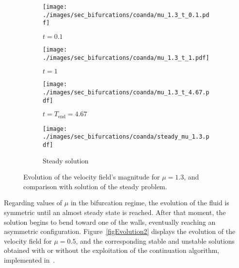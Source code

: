 \documentclass[reqno]{amsart}[standalone]
\theoremstyle{definition}
\theoremstyle{remark}
\begin{document}
\begin{figure}[ht]
\centering

\begin{subfigure}{0.47\linewidth}
\centering
\texttt{[image: ./images/sec\_bifurcations/coanda/mu\_1.3\_t\_0.1.pdf]}
\caption{$t=0.1$}
\end{subfigure}%
\hfill
\begin{subfigure}{0.47\linewidth}
\centering
\texttt{[image: ./images/sec\_bifurcations/coanda/mu\_1.3\_t\_1.pdf]}
\caption{$t=1$}
\end{subfigure}

\vspace{0.2cm}

\begin{subfigure}{0.47\linewidth}
\centering
\texttt{[image: ./images/sec\_bifurcations/coanda/mu\_1.3\_t\_4.67.pdf]}
\caption{$t = T_\text{end}=4.67$}
\end{subfigure}%
\hfill
\begin{subfigure}{0.47\linewidth}
\centering
\texttt{[image: ./images/sec\_bifurcations/coanda/steady\_mu\_1.3.pdf]}
\caption{Steady solution}
\end{subfigure}

\caption{Evolution of the velocity field's magnitude for $\mu = 1.3$, and comparison with solution of the steady problem.}
    \label{figEvolution1}
\end{figure}

Regarding values of $\mu$ in the bifurcation regime, the evolution of the fluid is symmetric until an almost steady state is reached.
After that moment, the solution begins to bend toward one of the walls, eventually reaching an asymmetric configuration.
Figure~\ref{figEvolution2} displays the evolution of the velocity field for $\mu=0.5$, and the corresponding stable and unstable solutions obtained with or without the exploitation of the continuation algorithm, implemented in~\parencite{RozzaBallarinScandurraPichi2024,allgower_numerical_1990}.
\end{document}
